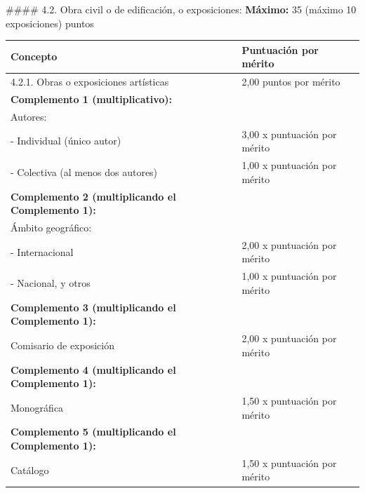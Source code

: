 \documentclass{article}
\begin{document}
\begin{itemize}
\begin{itemize}
\begin{scriptsize}
                  \#\#\#\# 4.2. Obra civil o de edificación, o exposiciones:
                  \textbf{Máximo:} 35 (máximo 10 exposiciones) puntos

                  \vspace{0.4cm}
                  \begin{table}[h!]\centering\renewcommand{\arraystretch}{1.3}
                    \begin{tabular}{|p{}|p{}|}\hline
                      Concepto                                                 & Puntuación por mérito        \\\hline
                      4.2.1. Obras o exposiciones artísticas                   & 2,00 puntos por mérito       \\\hline
                      \textbf{Complemento 1 (multiplicativo):}                 &                              \\\hline
                      Autores:                                                 &                              \\\hline
                      - Individual (único autor)                               & 3,00 x puntuación por mérito \\\hline
                      - Colectiva (al menos dos autores)                       & 1,00 x puntuación por mérito \\\hline
                      \textbf{Complemento 2 (multiplicando el Complemento 1):} &                              \\\hline
                      Ámbito geográfico:                                       &                              \\\hline
                      - Internacional                                          & 2,00 x puntuación por mérito \\\hline
                      - Nacional, y otros                                      & 1,00 x puntuación por mérito \\\hline
                      \textbf{Complemento 3 (multiplicando el Complemento 1):} &                              \\\hline
                      Comisario de exposición                                  & 2,00 x puntuación por mérito \\\hline
                      \textbf{Complemento 4 (multiplicando el Complemento 1):} &                              \\\hline
                      Monográfica                                              & 1,50 x puntuación por mérito \\\hline
                      \textbf{Complemento 5 (multiplicando el Complemento 1):} &                              \\\hline
                      Catálogo                                                 & 1,50 x puntuación por mérito \\\hline
                    \end{tabular}\end{table}
                  \vspace{0.4cm}


\end{scriptsize}
\end{itemize}
\end{itemize}
\end{document}

